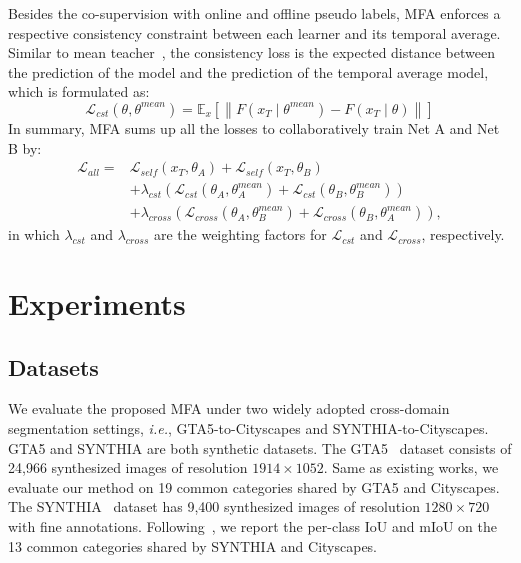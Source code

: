 \documentclass{bmvc2k}
\begin{document}
Besides the co-supervision with online and offline pseudo labels, MFA enforces a respective consistency constraint between each learner and its temporal average. Similar to mean teacher~\cite{tarvainen2017mean}, the consistency loss is the expected distance between the prediction of the model and the prediction of the temporal average model, which is formulated as:\begin{equation}
\label{equ:option4}
\mathcal{L}_{cst}(\theta, \theta^{mean}) = \mathbb{E}_{x}\left [ \left \| F\left ( x_{T} \mid\theta^{mean}\right ) - F\left ( x_{T} \mid \theta\right ) \right \| \right ]
\end{equation}In summary, MFA sums up all the losses to collaboratively train Net A and Net B by:\begin{equation}
\label{equ:option10}
\begin{aligned}
\mathcal{L}_{all} = &\mathcal{L}_{self}\left(x_{T},\theta_{A}\right)+\mathcal{L}_{self}(x_{T},\theta_{B}) \\
 &+ \lambda_{cst} \left(\mathcal{L}_{cst}\left(\theta_{A},\theta_{A}^{mean}\right)+\mathcal{L}_{cst}\left(\theta_{B},\theta_{B}^{mean}\right)\right) \\
 &+  \lambda_{cross}\left(\mathcal{L}_{cross}\left(\theta_{A}, \theta_{B}^{mean}\right)+\mathcal{L}_{cross}\left(\theta_{B}, \theta_{A}^{mean}\right)\right),
\end{aligned}
\end{equation}in which $\lambda_{cst}$  and $\lambda_{cross}$  are the weighting factors for $\mathcal{L}_{cst}$  and $\mathcal{L}_{cross}$, respectively.

\section{Experiments}
\subsection{Datasets}
We evaluate the proposed MFA under two widely adopted cross-domain segmentation settings, \emph{i.e.}, GTA5-to-Cityscapes and SYNTHIA-to-Cityscapes. 
GTA5 and SYNTHIA are both synthetic datasets. The GTA5~\cite{richter2016playing} dataset consists of 24,966 synthesized images of resolution $1914 \times 1052$. Same as existing works, we evaluate our method on 19 common categories shared by GTA5 and Cityscapes. The SYNTHIA~\cite{ros2016synthia} dataset has 9,400 synthesized images of resolution $1280 \times 720$ with fine annotations. Following~\cite{RN135,RN180}, we report the per-class IoU and mIoU on the 13 common categories shared by SYNTHIA and Cityscapes. 
\end{document}
